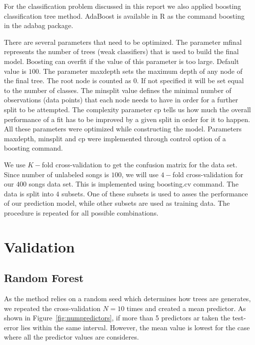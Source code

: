 \documentclass{article}
\begin{document}
For the classification problem discussed in this report we also applied boosting classification tree method. AdaBoost is available in R as the command {\selectfont boosting} in the {\selectfont adabag} package.

There are several parameters that need to be optimized. The parameter {\selectfont mfinal} represents the number of trees (weak classifiers) that is used to build the final model. Boosting can overfit if the value of this parameter is too large. Default value is $100$. The parameter {\selectfont maxdepth} sets the maximum depth of any node of the final tree. The root node is counted as $0$. If not specified it will be set equal to the number of classes. The {\selectfont minsplit} value defines the minimal number of observations (data points) that each node needs to have in order for a further split to be attempted. The complexity parameter {\selectfont cp} tells us how much the overall performance of a fit has to be improved by a given split in order for it to happen. All these parameters were optimized while constructing the model. Parameters {\selectfont maxdepth}, {\selectfont minsplit} and {\selectfont cp} were implemented through {\selectfont control} option of a {\selectfont boosting} command.

We use $K-$fold cross-validation to get the confusion matrix for the data set. Since number of unlabeled songs is $100$, we will use $4-$fold cross-validation for our $400$ songs data set. This is implemented using {\selectfont boosting.cv} command. The data is split into $4$ subsets. One of these subsets is used to asses the performance of our prediction model, while other subsets are used as training data. The procedure is repeated for all possible combinations.

\section{Validation}

\subsection{Random Forest}

As the method relies on a random seed which determines how trees are generates, we repeated the cross-validation $N=10$ times and created a mean predictor.
As shown in Figure~\ref{fig:numpredictors}, if more than 5 predictors ar taken the test-error lies within the same interval.
However, the mean value is lowest for the case where all the predictor values are consideres.
\end{document}
